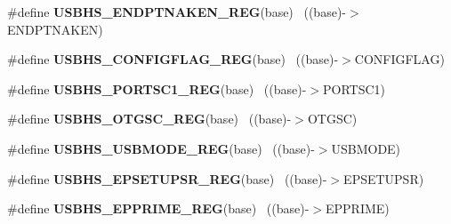 \begin{DoxyCompactItemize}
\item 
\hypertarget{group___u_s_b_h_s___register___accessor___macros_ga91e98225a6d4690df0f60c654e5cb932}{}\#define {\bfseries U\+S\+B\+H\+S\+\_\+\+E\+N\+D\+P\+T\+N\+A\+K\+E\+N\+\_\+\+R\+E\+G}(base)                          ~((base)-\/$>$E\+N\+D\+P\+T\+N\+A\+K\+E\+N)\label{group___u_s_b_h_s___register___accessor___macros_ga91e98225a6d4690df0f60c654e5cb932}

\item 
\hypertarget{group___u_s_b_h_s___register___accessor___macros_ga1db4f28521dc28605ca7310a0906f6d1}{}\#define {\bfseries U\+S\+B\+H\+S\+\_\+\+C\+O\+N\+F\+I\+G\+F\+L\+A\+G\+\_\+\+R\+E\+G}(base)                          ~((base)-\/$>$C\+O\+N\+F\+I\+G\+F\+L\+A\+G)\label{group___u_s_b_h_s___register___accessor___macros_ga1db4f28521dc28605ca7310a0906f6d1}

\item 
\hypertarget{group___u_s_b_h_s___register___accessor___macros_ga5e5e736d2831055da1cfed6f16047c56}{}\#define {\bfseries U\+S\+B\+H\+S\+\_\+\+P\+O\+R\+T\+S\+C1\+\_\+\+R\+E\+G}(base)                                ~((base)-\/$>$P\+O\+R\+T\+S\+C1)\label{group___u_s_b_h_s___register___accessor___macros_ga5e5e736d2831055da1cfed6f16047c56}

\item 
\hypertarget{group___u_s_b_h_s___register___accessor___macros_gaee5522430cc86d6efdb5105483ea64a9}{}\#define {\bfseries U\+S\+B\+H\+S\+\_\+\+O\+T\+G\+S\+C\+\_\+\+R\+E\+G}(base)                                    ~((base)-\/$>$O\+T\+G\+S\+C)\label{group___u_s_b_h_s___register___accessor___macros_gaee5522430cc86d6efdb5105483ea64a9}

\item 
\hypertarget{group___u_s_b_h_s___register___accessor___macros_ga291c85f7ac03fa54721d3d4aa715da51}{}\#define {\bfseries U\+S\+B\+H\+S\+\_\+\+U\+S\+B\+M\+O\+D\+E\+\_\+\+R\+E\+G}(base)                                ~((base)-\/$>$U\+S\+B\+M\+O\+D\+E)\label{group___u_s_b_h_s___register___accessor___macros_ga291c85f7ac03fa54721d3d4aa715da51}

\item 
\hypertarget{group___u_s_b_h_s___register___accessor___macros_gac56f371fe835d94b88886a51b92795fb}{}\#define {\bfseries U\+S\+B\+H\+S\+\_\+\+E\+P\+S\+E\+T\+U\+P\+S\+R\+\_\+\+R\+E\+G}(base)                            ~((base)-\/$>$E\+P\+S\+E\+T\+U\+P\+S\+R)\label{group___u_s_b_h_s___register___accessor___macros_gac56f371fe835d94b88886a51b92795fb}

\item 
\hypertarget{group___u_s_b_h_s___register___accessor___macros_ga53f98d5a3f259a14c35f8fd246d111e7}{}\#define {\bfseries U\+S\+B\+H\+S\+\_\+\+E\+P\+P\+R\+I\+M\+E\+\_\+\+R\+E\+G}(base)                                ~((base)-\/$>$E\+P\+P\+R\+I\+M\+E)\label{group___u_s_b_h_s___register___accessor___macros_ga53f98d5a3f259a14c35f8fd246d111e7}


\end{DoxyCompactItemize}
